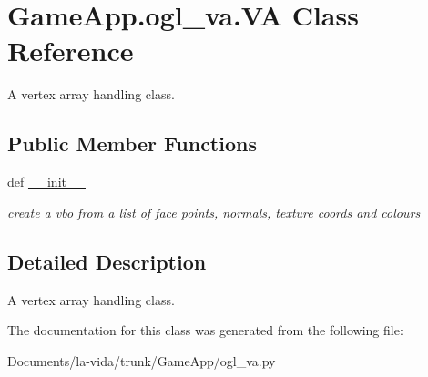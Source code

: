 \hypertarget{classGameApp_1_1ogl__va_1_1VA}{
\section{GameApp.ogl\_\-va.VA Class Reference}
\label{classGameApp_1_1ogl__va_1_1VA}
}
A vertex array handling class.  


\subsection*{Public Member Functions}
\begin{CompactItemize}
\item 
\hypertarget{classGameApp_1_1ogl__va_1_1VA_4b0c57cbdd059fb3115a5acef2a86cc4}{
def \hyperlink{classGameApp_1_1ogl__va_1_1VA_4b0c57cbdd059fb3115a5acef2a86cc4}{\_\-\_\-init\_\-\_\-}}
\label{classGameApp_1_1ogl__va_1_1VA_4b0c57cbdd059fb3115a5acef2a86cc4}

\begin{CompactList}\small\item\em create a vbo from a list of face points, normals, texture coords and colours \item\end{CompactList}\end{CompactItemize}


\subsection{Detailed Description}
A vertex array handling class. 

The documentation for this class was generated from the following file:\begin{CompactItemize}
\item 
Documents/la-vida/trunk/GameApp/ogl\_\-va.py\end{CompactItemize}
